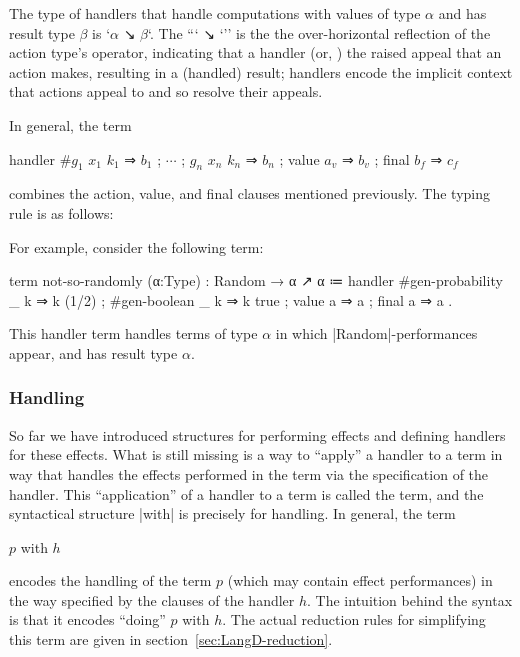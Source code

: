 The type of handlers that handle computations with values of type $α$ and has result type $β$ is \code`$α$ ↘ $β$`.
The ``\code` ↘ `'' is the the over-horizontal reflection of the action type's operator, indicating that a handler  (or, ) the raised appeal that an action makes, resulting in a (handled) result;
handlers encode the implicit context that actions appeal to and so resolve their appeals.

In general, the term
\begin{snippet}
handler
  { #$g_1$ $x_1$ $k_1$ ⇒ $b_1$ ; $\cdots$ ; $g_n$ $x_n$ $k_n$ ⇒ $b_n$
  ; value $a_v$ ⇒ $b_v$
  ; final $b_f$ ⇒ $c_f$ }
\end{snippet}
combines the action, value, and final clauses mentioned previously.
The typing rule is as follows:



\newparagraph
For example, consider the following term:
\begin{snippet}
term not-so-randomly (α:Type) : Random → α ↗ α
  ≔ handler
      { #gen-probability _ k ⇒ k (1/2)
      ; #gen-boolean     _ k ⇒ k true
      ; value            a   ⇒ a
      ; final            a   ⇒ a }.
\end{snippet}
This handler term handles terms of type $α$ in which \code|Random|-performances appear, and has result type $α$.

\subsubsection{Handling}
\label{sec:handling}

So far we have introduced structures for
performing effects and
defining handlers for these effects.
What is still missing is a way to ``apply'' a handler to a term in way that handles the effects performed in the term via the specification of the handler.
This ``application'' of a handler to a term is called  the term,
and the syntactical structure \code|with| is precisely for handling.
In general, the term
\begin{snippet}
$p$ with $h$
\end{snippet}
encodes the handling of the term $p$ (which may contain effect performances)
in the way specified by the clauses of the handler $h$.
The intuition behind the syntax is that it encodes ``doing'' $p$ with $h$.
The actual reduction rules for simplifying this term are given in section~\ref{sec:LangD-reduction}.

